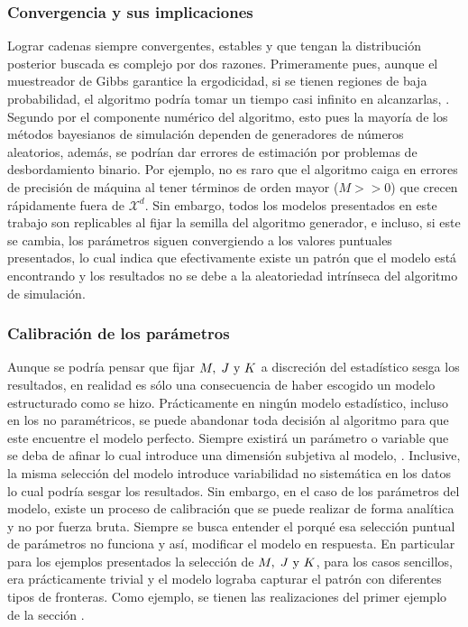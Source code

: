 \documentclass[../Main/Main.tex]{subfiles}
\begin{document}
\subsubsection*{Convergencia y sus implicaciones}
Lograr cadenas siempre convergentes, estables y que tengan la distribución posterior buscada es complejo por dos razones. Primeramente pues, aunque el muestreador de Gibbs garantice la ergodicidad, si se tienen regiones de baja probabilidad, el algoritmo podría tomar un tiempo casi infinito en alcanzarlas, \citet{robert2004monte}. Segundo por el componente numérico del algoritmo, esto pues la mayoría de los métodos bayesianos de simulación dependen de generadores de números aleatorios, además, se podrían dar errores de estimación por problemas de desbordamiento binario. Por ejemplo, no es raro que el algoritmo caiga en errores de precisión de máquina al tener términos de orden mayor ($M>>0$) que crecen rápidamente fuera de $\mathcal{X}^d$. Sin embargo, todos los modelos presentados en este trabajo son replicables al fijar la semilla del algoritmo generador, e incluso, si este se cambia, los parámetros siguen convergiendo a los valores puntuales presentados, lo cual indica que efectivamente existe un patrón que el modelo está encontrando y los resultados no se debe a la aleatoriedad intrínseca del algoritmo de simulación.

\subsubsection*{Calibración de los parámetros} 
Aunque se podría pensar que fijar $M,\;J\text{ y }K$ a discreción del estadístico sesga los resultados, en realidad es sólo una consecuencia de haber escogido un modelo estructurado como se hizo. Prácticamente en ningún modelo estadístico, incluso en los no paramétricos, se puede abandonar toda decisión al algoritmo para que este encuentre el modelo perfecto. Siempre existirá un parámetro o variable que se deba de afinar lo cual introduce una dimensión subjetiva al modelo, \citet{wasserman2007all}. Inclusive, la misma selección del modelo introduce variabilidad no sistemática en los datos lo cual podría sesgar los resultados. Sin embargo, en el caso de los parámetros del modelo, existe un proceso de calibración que se puede realizar de forma analítica y no por fuerza bruta. Siempre se busca entender el porqué esa selección puntual de parámetros no funciona y así, modificar el modelo en respuesta. En particular para los ejemplos presentados la selección de $M,\;J\text{ y }K$, para los casos sencillos, era prácticamente trivial y el modelo lograba capturar el patrón con diferentes tipos de fronteras. Como ejemplo, se tienen las realizaciones del primer ejemplo de la sección \pageref{sec:T1}.
\end{document}

